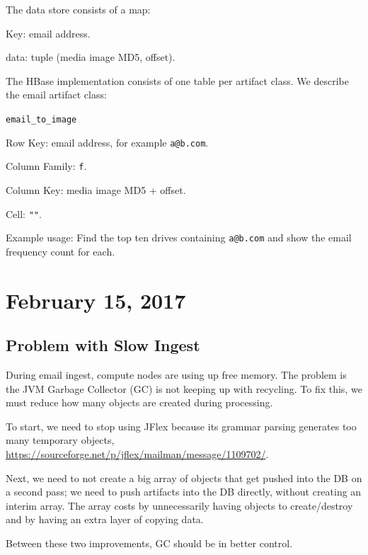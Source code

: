 \documentclass[12pt,twoside]{article}
\begin{document}
The data store consists of a map:
\begin{compactitem}
\item Key: email address.
\item data: tuple (media image MD5, offset).
\end{compactitem}

The HBase implementation consists of one table per artifact class. We describe the email artifact class:
\begin{compactitem}
\item \verb+email_to_image+
  \begin{compactitem}
  \item Row Key: email address, for example \verb+a@b.com+.
  \item Column Family: \verb+f+.
  \item Column Key: media image MD5 + offset.
  \item Cell: \verb+""+.
  \end{compactitem}
\end{compactitem}

Example usage: Find the top ten drives containing \verb+a@b.com+ and show the email frequency count for each.

\section{February 15, 2017}
\subsection{Problem with Slow Ingest}
During email ingest, compute nodes are using up free memory. The problem is the JVM Garbage Collector (GC) is not keeping up with recycling. To fix this, we must reduce how many objects are created during processing.

To start, we need to stop using JFlex because its grammar parsing generates too many temporary objects, \url{https://sourceforge.net/p/jflex/mailman/message/1109702/}.

Next, we need to not create a big array of objects that get pushed into the DB on a second pass; we need to push artifacts into the DB directly, without creating an interim array. The array costs by unnecessarily having objects to create/destroy and by having an extra layer of copying data.

Between these two improvements, GC should be in better control.
\end{document}
